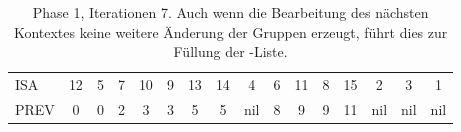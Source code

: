 \begin{table}[H]
\begin{adjustbox}{max width=\textwidth}
\begin{tabular}{lccccccccccccccc}
\multicolumn{1}{l|}{ISA}     & 12                      & 5                         & 7                       & 10                         & 9                           & 13                        & 14                         & 4                       & 6                        & 11 & 8                       & 15  & 2   & 3   & 1   \\
\multicolumn{1}{l|}{PREV}    & 0                       & \cellcolor[HTML]{\red}0 & 2                       & 3                          & 3                           & 5                         & 5                          & nil                     & 8                        & 9  & 9                       & 11  & nil & nil & nil
\end{tabular}
\end{adjustbox}

\caption[Phase 1, Iterationen 7]{Phase 1, Iterationen 7. Auch wenn die Bearbeitung des nächsten Kontextes keine weitere Änderung der Gruppen erzeugt, führt dies zur Füllung der \prevpointer-Liste.}
\label{table_complex_example_1_7} 
\end{table}

